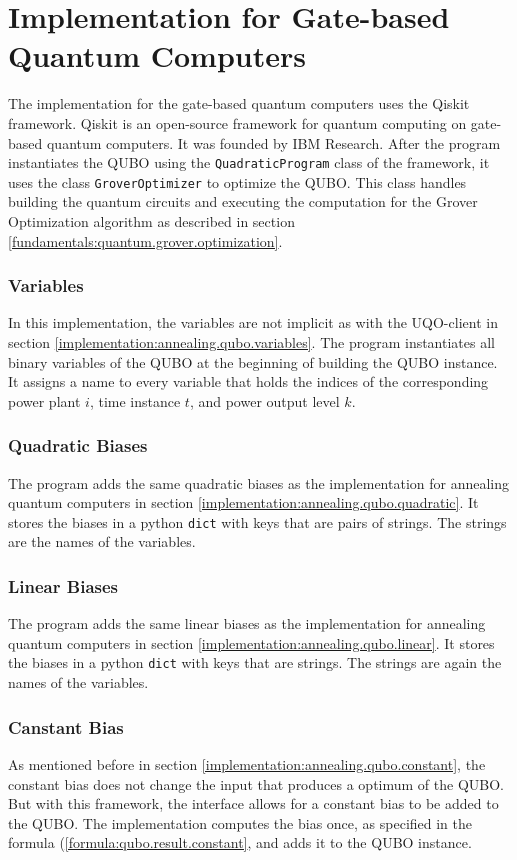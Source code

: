 \section{Implementation for Gate-based Quantum Computers}
\label{implement:gate.qubo}

The implementation for the gate-based quantum computers uses the Qiskit framework.
Qiskit is an open-source framework for quantum computing on gate-based quantum computers.
It was founded by IBM Research.
\cite{QiskitWeb, QiskitGitHub}
After the program instantiates the QUBO using the \texttt{QuadraticProgram} class of the framework, it uses the class \texttt{GroverOptimizer} to optimize the QUBO.
This class handles building the quantum circuits and executing the computation for the Grover Optimization algorithm as described in section \ref{fundamentals:quantum.grover.optimization}.

\subsubsection{Variables}

In this implementation, the variables are not implicit as with the UQO-client in section \ref{implementation:annealing.qubo.variables}.
The program instantiates all binary variables of the QUBO at the beginning of building the QUBO instance.
It assigns a name to every variable that holds the indices of the corresponding power plant $i$, time instance $t$, and power output level $k$.

\subsubsection{Quadratic Biases}

The program adds the same quadratic biases as the implementation for annealing quantum computers in section \ref{implementation:annealing.qubo.quadratic}.
It stores the biases in a python \texttt{dict} with keys that are pairs of strings.
The strings are the names of the variables.

\subsubsection{Linear Biases}

The program adds the same linear biases as the implementation for annealing quantum computers in section \ref{implementation:annealing.qubo.linear}.
It stores the biases in a python \texttt{dict} with keys that are strings.
The strings are again the names of the variables.

\subsubsection{Canstant Bias}

As mentioned before in section \ref{implementation:annealing.qubo.constant}, the constant bias does not change the input that produces a optimum of the QUBO.
But with this framework, the interface allows for a constant bias to be added to the QUBO.
The implementation computes the bias once, as specified in the formula (\ref{formula:qubo.result.constant}, and adds it to the QUBO instance.
